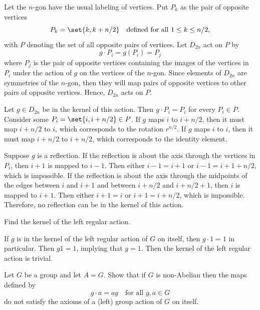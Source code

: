\begin{sol}
    Let the $n$-gon have the usual labeling of vertices. Put $P_k$ as the pair of opposite vertices
    \[P_k = \set{k, k + n/2} \quad \text{defined for all $1 \leq k \leq n/2$},\]
    with $P$ denoting the set of all opposite pairs of vertices. Let $D_{2n}$ act on $P$ by
    \[g \cdot P_i = g(P_i) = P_j\]
    where $P_j$ is the pair of opposite vertices containing the images of the vertices in $P_i$ under the action of $g$ on the vertices of the $n$-gon. Since elements of $D_{2n}$ are symmetries of the $n$-gon, then they will map pairs of opposite vertices to other pairs of opposite vertices. Hence, $D_{2n}$ acts on $P$.

    Let $g \in D_{2n}$ be in the kernel of this action. Then $g \cdot P_i = P_i$ for every $P_i \in P$. Consider some $P_i = \set{i, i + n/2} \in P$. If $g$ maps $i$ to $i + n/2$, then it must map $i + n/2$ to $i$, which corresponds to the rotation $r^{n/2}$. If $g$ maps $i$ to $i$, then it must map $i + n/2$ to $i + n/2$, which corresponds to the identity element. 

    Suppose $g$ is a reflection. If the reflection is about the axis through the vertices in $P_i$, then $i + 1$ is mapped to $i - 1$. Then either $i - 1 = i + 1$ or $i - 1 = i + 1 + n/2$, which is impossible. If the reflection is about the axis through the midpoints of the edges between $i$ and $i + 1$ and between $i + n/2$ and $i + n/2 + 1$, then $i$ is mapped to $i + 1$. Then either $i + 1 = i$ or $i + 1 = i + n/2$, which is impossible. Therefore, no reflection can be in the kernel of this action.
\end{sol}

\begin{exercise}\label{ex1.7.13}
    Find the kernel of the left regular action.
\end{exercise}

\begin{sol}
    If $g$ is in the kernel of the left regular action of $G$ on itself, then $g \cdot 1 = 1$ in particular. Then $g1 = 1$, implying that $g = 1$. Then the kernel of the left regular action is trivial.
\end{sol}

\begin{exercise}\label{ex1.7.14}
    Let $G$ be a group and let $A = G$. Show that if $G$ is non-Abelian then the maps defined by  
    \[ g \cdot a = ag \quad \text{for all } g,a\in G \]
    do not satisfy the axioms of a (left) group action of $G$ on itself.
\end{exercise}

